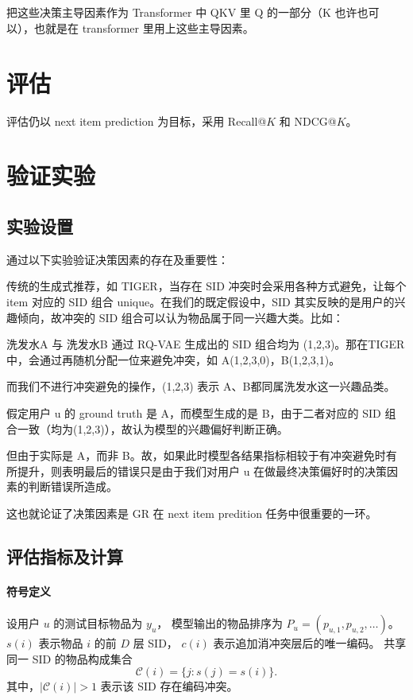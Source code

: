 \documentclass[UTF8,a4paper,zihao=-4,fontset=fandol]{ctexart}
\begin{document}
\subsection{}
把这些决策主导因素作为 Transformer 中 QKV 里 Q 的一部分（K 也许也可以），也就是在 transformer 里用上这些主导因素。

\section{评估}

评估仍以 next item prediction 为目标，采用 Recall@$K$ 和 NDCG@$K$。

\section{验证实验}

\subsection{实验设置}
通过以下实验验证决策因素的存在及重要性：

传统的生成式推荐，如 TIGER，当存在 SID 冲突时会采用各种方式避免，让每个 item 对应的 SID 组合 unique。在我们的既定假设中，SID 其实反映的是用户的兴趣倾向，故冲突的 SID 组合可以认为物品属于同一兴趣大类。比如：

洗发水A 与 洗发水B 通过 RQ-VAE 生成出的 SID 组合均为 (1,2,3)。那在TIGER中，会通过再随机分配一位来避免冲突，如 A(1,2,3,0)，B(1,2,3,1)。

而我们不进行冲突避免的操作，(1,2,3) 表示 A、B都同属洗发水这一兴趣品类。

假定用户 u 的 ground truth 是 A，而模型生成的是 B，由于二者对应的 SID 组合一致（均为(1,2,3)），故认为模型的兴趣偏好判断正确。

但由于实际是 A，而非 B。故，如果此时模型各结果指标相较于有冲突避免时有所提升，则表明最后的错误只是由于我们对用户 u 在做最终决策偏好时的决策因素的判断错误所造成。

这也就论证了决策因素是 GR 在 next item predition 任务中很重要的一环。

\subsection{评估指标及计算}

\paragraph{符号定义}
设用户 $u$ 的测试目标物品为 $y_u$，
模型输出的物品排序为
$P_u=(p_{u,1},p_{u,2},\ldots)$。
$s(i)$ 表示物品 $i$ 的前 $D$ 层 SID，
$c(i)$ 表示追加消冲突层后的唯一编码。
共享同一 SID 的物品构成集合
\[
    \mathcal{C}(i)=\{j:s(j)=s(i)\}.
\]
其中，$|\mathcal{C}(i)|>1$ 表示该 SID 存在编码冲突。
\end{document}
